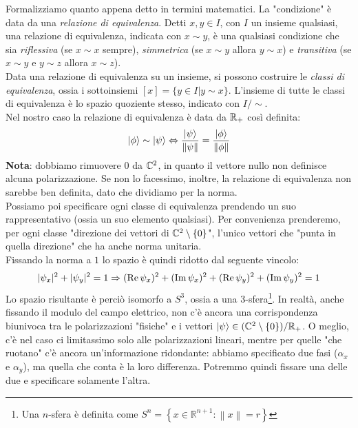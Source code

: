 \documentclass[FisicaTeorica.tex]{subfiles}
\begin{document}
Formalizziamo quanto appena detto in termini matematici. La "condizione" è data da una \textit{relazione di equivalenza}. Detti $x,y\in I$, con $I$ un insieme qualsiasi, una relazione di equivalenza, indicata con $x\sim y$, è una qualsiasi condizione che sia \textit{riflessiva} (se $x\sim x$ sempre), \textit{simmetrica} (se $x\sim y$ allora $y\sim x$) e \textit{transitiva} (se $x\sim y$ e $y\sim z$ allora $x\sim z$).\\
Data una relazione di equivalenza su un insieme, si possono costruire le \textit{classi di equivalenza}, ossia i sottoinsiemi $[x] = \{y \in I | y\sim x\}$. L'insieme di tutte le classi di equivalenza è lo spazio quoziente stesso, indicato con $I/\sim$.\\
Nel nostro caso la relazione di equivalenza è data da $\mathbb{R}_+$ così definita:
\[
\ket{\phi} \sim \ket{\psi} \Leftrightarrow \frac{\ket{\psi}}{\left\lVert\psi\right\rVert} = \frac{\ket{\phi}}{\left\lVert\phi\right\rVert}
\]
\textbf{Nota}: dobbiamo rimuovere $0$ da $\mathbb{C}^2$, in quanto il vettore nullo non definisce alcuna polarizzazione. Se non lo facessimo, inoltre, la relazione di equivalenza non sarebbe ben definita, dato che dividiamo per la norma.\\
Possiamo poi specificare ogni classe di equivalenza prendendo un suo rappresentativo (ossia un suo elemento qualsiasi). Per convenienza prenderemo, per ogni classe "direzione dei vettori di $\mathbb{C}^2 \setminus \{0\}$", l'unico vettori che "punta in quella direzione" che ha anche norma unitaria.\\
Fissando la norma a $1$ lo spazio è quindi ridotto dal seguente vincolo:
\[
|\psi_x|^2 + |\psi_y|^2 = 1 \Rightarrow (\operatorname{Re}\psi_x)^2 + (\operatorname{Im}\psi_x)^2 + (\operatorname{Re}\psi_y)^2 + (\operatorname{Im}\psi_y)^2 = 1
\]
Lo spazio risultante è perciò isomorfo a $S^3$, ossia a una $3$-sfera\footnote{Una $n$-sfera è definita come $S^{n}=\left\{x\in \mathbb {R} ^{n+1}:\left\|x\right\|=r\right\}$}.
In realtà, anche fissando il modulo del campo elettrico, non c'è ancora una corrispondenza biunivoca tra le polarizzazioni "fisiche" e i vettori $\ket{\psi} \in (\mathbb{C}^2\setminus\{0\})/\mathbb{R}_+$. O meglio, c'è nel caso ci limitassimo solo alle polarizzazioni lineari, mentre per quelle "che ruotano" c'è ancora un'informazione ridondante: abbiamo specificato due fasi ($\alpha_x$ e $\alpha_y$), ma quella che conta è la loro differenza. Potremmo quindi fissare una delle due e specificare solamente l'altra.\\
\end{document}
